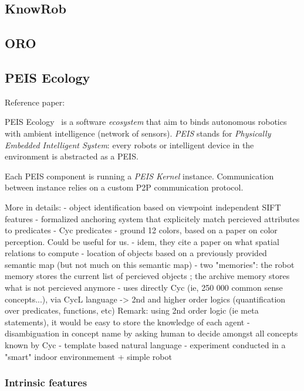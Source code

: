 \documentclass[a4paper]{article}
\begin{document}
\subsection{KnowRob}
\label{sect|knowrob}

\subsection{ORO}
\label{sect|oro}

\subsection{PEIS Ecology}
\label{sect|peis-ecology}

Reference paper:~\cite{Daoutis2009}

{\sc PEIS Ecology}~\cite{Saffiotti2005} is a software \emph{ecosystem} that aim to binds autonomous
robotics with ambient intelligence (network of sensors). \emph{PEIS} stands for
\emph{Physically Embedded Intelligent System}: every robots or intelligent
device in the environment is abstracted as a PEIS.

Each PEIS component is running a \emph{PEIS Kernel} instance. Communication
between instance relies on a custom P2P communication protocol.

More in details:
- object identification based on viewpoint independent SIFT features
- formalized anchoring system that explicitely match percieved attributes to predicates
- Cyc predicates
- ground 12 colors, based on a paper on color perception. Could be useful for us.
- idem, they cite a paper on what spatial relations to compute
- location of objects based on a previously provided semantic map (but not much on this semantic map)
- two "memories": the robot memory stores the current list of percieved objects ; the archive memory stores what is not percieved anymore
- uses directly Cyc (ie, 250 000 common sense concepts...), via CycL language -> 2nd and higher order logics (quantification over predicates, functions, etc)
Remark: using 2nd order logic (ie meta statements), it would be easy to store the knowledge of each agent
- disambiguation in concept name by asking human to decide amongst all concepts known by Cyc
- template based natural language
- experiment conducted in a "smart" indoor environmement + simple robot

\subsubsection{Intrinsic features}
\label{sect|peis-intrinsic-features}
\end{document}
